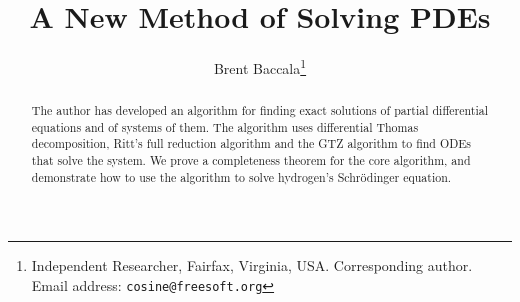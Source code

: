 \documentclass{article}
\title{A New Method of Solving PDEs}
\author{Brent Baccala\footnote{Independent Researcher, Fairfax, Virginia, USA.
Corresponding author.  Email address: {\tt cosine@freesoft.org}}}
\theoremstyle{definition}
\theoremstyle{plain}
\begin{document}
\parindent 0pt

\maketitle

\begin{abstract}
The author has developed an algorithm
for finding exact solutions of partial differential equations and of systems of them.
The algorithm uses differential Thomas decomposition, Ritt's full reduction algorithm \cite{Ritt} and the GTZ algorithm \cite{GTZ}
to find ODEs that solve the system.  We prove a completeness theorem for the
core algorithm, and demonstrate how to use the algorithm
to solve hydrogen's Schr\"odinger equation.
\end{abstract}

\parskip 12pt

\end{document}
